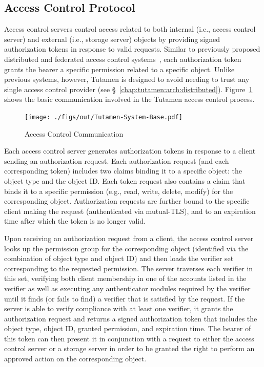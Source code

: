 \subsection{Access Control Protocol}
\label{chap:tutamen:arch:acp}

Access control servers control access related to both internal (i.e.,
access control server) and external (i.e., storage server) objects by
providing signed authorization tokens in response to valid
requests. Similar to previously proposed distributed and federated
access control systems~\cite{calero2010, leandro2012}, each
authorization token grants the bearer a specific permission related to
a specific object. Unlike previous systems, however, Tutamen is
designed to avoid needing to trust any single access control provider
(see \S~\ref{chap:tutamen:arch:distributed}).
Figure~\ref{fig:tutamen:systembase} shows the basic communication
involved in the Tutamen access control process.

\begin{figure}[t]
  \centering
  \texttt{[image: ./figs/out/Tutamen-System-Base.pdf]}
  \caption{Access Control Communication}
  \label{fig:tutamen:systembase}
\end{figure}

Each access control server generates authorization tokens in response
to a client sending an authorization request. Each authorization
request (and each corresponding token) includes two claims binding it
to a specific object: the object type and the object ID. Each token
request also contains a claim that binds it to a specific permission
(e.g., read, write, delete, modify) for the corresponding
object. Authorization requests are further bound to the specific
client making the request (authenticated via mutual-TLS), and to an
expiration time after which the token is no longer valid.

Upon receiving an authorization request from a client, the access
control server looks up the permission group for the corresponding
object (identified via the combination of object type and object ID)
and then loads the verifier set corresponding to the requested
permission. The server traverses each verifier in this set, verifying
both client membership in one of the accounts listed in the verifier
as well as executing any authenticator modules required by the
verifier until it finds (or fails to find) a verifier that is
satisfied by the request. If the server is able to verify compliance
with at least one verifier, it grants the authorization request and
returns a signed authorization token that includes the object type,
object ID, granted permission, and expiration time. The bearer of this
token can then present it in conjunction with a request to either the
access control server or a storage server in order to be granted the
right to perform an approved action on the corresponding object.

